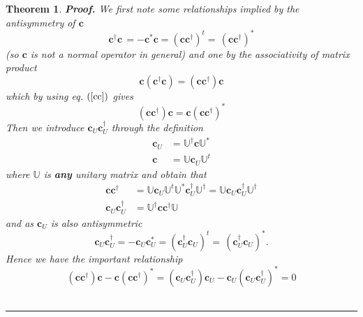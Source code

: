 \documentclass[aps,preprint]{revtex4}%
\newtheorem{theorem}{Theorem}
\newenvironment{proof}[1][Proof]{\noindent\textbf{#1.} }{\ \rule{0.5em}{0.5em}}
\begin{document}
\begin{theorem}
\begin{proof}
We first note some relationships implied by the antisymmetry of $\mathbf{c}$%
\begin{equation}
\mathbf{c}^{\dagger}\mathbf{c\,=-c}^{\ast}\mathbf{c}=\left(  \mathbf{cc}%
^{\dagger}\right)  ^{t}=\mathbf{\,}\left(  \mathbf{cc}^{\dagger}\right)
^{\ast}\label{cc}%
\end{equation}
(so $\mathbf{c}$ is not a normal operator in general) and one by the
associativity of matrix product
\begin{equation}
\mathbf{c}\left(  \mathbf{c}^{\dagger}\mathbf{c}\right)  =\left(
\mathbf{cc}^{\dagger}\right)  \mathbf{c}%
\end{equation}
which by using eq. $\left(  \ref{cc}\right)  $ gives
\begin{equation}
\left(  \mathbf{cc}^{\dagger}\right)  \mathbf{c=c}\left(  \mathbf{cc}%
^{\dagger}\right)  ^{\ast}\label{cr}%
\end{equation}
Then we introduce $\mathbf{c}_{U}\mathbf{c}_{U}^{\dagger}$ through the
definition
\begin{align}
\mathbf{c}_{U} &  =\mathbb{U}^{\dagger}\mathbf{c}\mathbb{U}^{\ast}\nonumber\\
\mathbf{c} &  =\mathbb{U}\mathbf{c}_{U}\mathbb{U}^{t}%
\end{align}
where $\mathbb{U}$ is \textbf{any} unitary matrix and obtain that
\begin{align}
\mathbf{cc}^{\dagger} &  =\mathbb{U}\mathbf{c}_{U}\mathbb{U}^{t}%
\mathbb{U}^{\ast}\mathbf{c}_{U}^{\dagger}\mathbb{U}^{\dagger}=\mathbb{U}%
\mathbf{c}_{U}\mathbf{c}_{U}^{\dagger}\mathbb{U}^{\dagger}\nonumber\\
\mathbf{c}_{U}\mathbf{c}_{U}^{\dagger} &  =\mathbb{U}^{\dagger}\mathbf{cc}%
^{\dagger}\mathbb{U}%
\end{align}
and as $\mathbf{c}_{U}$ is also antisymmetric
\begin{equation}
\mathbf{c}_{U}\mathbf{c}_{U}^{\dagger}=-\mathbf{c}_{U}\mathbf{c}_{U}^{\ast
}=\left(  \mathbf{c}_{U}^{\dagger}\mathbf{c}_{U}\right)  ^{t}=\mathbf{\,}%
\left(  \mathbf{c}_{U}^{\dagger}\mathbf{c}_{U}\right)  ^{\ast}.
\end{equation}
Hence we have the important relationship
\begin{equation}
\left(  \mathbf{cc}^{\dagger}\right)  \mathbf{c-c}\left(  \mathbf{cc}%
^{\dagger}\right)  ^{\ast}=\left(  \mathbf{c}_{U}\mathbf{c}_{U}^{\dagger
}\right)  \mathbf{c}_{U}-\mathbf{c}_{U}\left(  \mathbf{c}_{U}\mathbf{c}%
_{U}^{\dagger}\right)  ^{\ast}=0\label{cu}%

\end{equation}
\end{proof}
\end{theorem}
\end{document}
